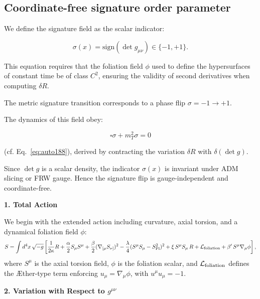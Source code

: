 \documentclass{article}
\newcommand{\Splanck}{\ensuremath{S_{\mathrm{Pl}}}}
\begin{document}
\subsection*{Coordinate-free signature order parameter}
\label{sec:sig-invariant}

We define the signature field as the scalar indicator:

\begin{equation}
\sigma(x) = \mathrm{sign}(\det g_{\mu\nu}) \in \{-1, +1\}.
\end{equation}

\noindent
This equation requires that the foliation field $\phi$ used to define the hypersurfaces of constant time be of class $C^2$, ensuring the validity of second derivatives when computing $\delta R$.


The metric signature transition corresponds to a phase flip \( \sigma = -1 \rightarrow +1 \).

The dynamics of this field obey:

\begin{equation}
\square \sigma + m_T^2 \sigma = 0
\end{equation}

(cf. Eq.~\ref{eq:auto188}), derived by contracting the variation \( \delta R \) with \( \delta(\det g) \).

Since \( \det g \) is a scalar density, the indicator \( \sigma(x) \) is invariant under ADM slicing or FRW gauge.  
Hence the signature flip is gauge-independent and coordinate-free.


\vspace{1em}
\noindent \textbf{1. Total Action}

We begin with the extended action including curvature, axial torsion, and a dynamical foliation field $\phi$:
\begin{equation}
S = \int d^4x\, \sqrt{-g} \left[
\frac{1}{2\kappa} R
+ \frac{\alpha}{2} S_\mu S^\mu
+ \frac{\beta}{2} (\nabla_{[\mu} S_{\nu]})^2
- \frac{\lambda}{4}(S^\mu S_\mu - \Splanck^2)^2
+ \xi\, S^\mu S_\mu\, R
+ \mathcal{L}_{\rm foliation}
+ \beta'\, S^\mu \nabla_\mu \phi
\right],
\end{equation}
where $S^\mu$ is the axial torsion field, $\phi$ is the foliation scalar, and $\mathcal{L}_{\rm foliation}$ defines the Æther-type term enforcing $u_\mu = \nabla_\mu \phi$, with $u^\mu u_\mu = -1$.

\vspace{1em}
\noindent \textbf{2. Variation with Respect to \boldmath$g^{\mu\nu}$}
\end{document}
